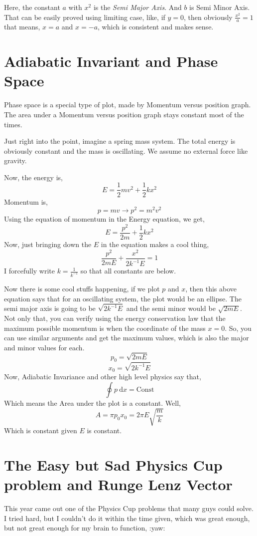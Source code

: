 \documentclass[11pt,a4paper]{article}
\begin{document}
Here, the constant $a$ with $x^2$ is the \emph{Semi Major Axis}. And $b$ is Semi Minor Axis. That can be easily proved using limiting case, like, if $y=0   $, 
then obviously $\frac{x^2}{a} = 1$ that means, $x = a$ and $x = -a$, which is consistent and makes sense. 
\section{ Adiabatic Invariant and Phase Space }

Phase space is a special type of plot, made by Momentum versus position graph. The area under a Momentum versus position graph stays constant most of the times. 

Just right into the point, imagine a spring mass system. The total energy is obviously constant and the mass is oscillating. We assume no external force like gravity.

Now, the energy is,
\[ 
E = \frac{1}{2} m v^2 + \frac{1}{2} k x^2
\]  
Momentum is, 
\[ 
p=mv \to p^2 = m^2 v^2
\]
Using the equation of momentum in the Energy equation, we get,
\[ 
E = \frac{p^2}{2m} + \frac{1}{2} kx^2
\]
Now, just bringing down the $E$ in the equation makes a cool thing,
\[ 
\frac{p^2}{2mE } + \frac{x^2}{2 k^{-1} E} = 1
\]
I forcefully write $k = \frac{1}{k^{-1}}$ so that all constants are below. 

Now there is some cool stuffs happening, if we plot $p$ and $x$, then this above equation says that for an oscillating system, the plot would be an ellipse. The semi major axis is going to be $\sqrt{2 k^{-1} E} $ and the semi minor would be $\sqrt{2 m E} $. Not only that, you can verify using the energy conservation law that the maximum possible momentum is when the coordinate of the mass $x=0$. So, you can use similar arguments and get the maximum values, which is also the major and minor values for each.
\[ 
p_0 = \sqrt{2mE} 
\]
\[
    x_0 = \sqrt{2 k^{-1} E} 
\]
Now, Adiabatic Invariance and other high level physics say that,
\[ 
\oint p \ \mathrm{d}  x = \text{Const}
\]
Which means the Area under the plot is a constant. Well,
\[ 
A = \pi p_0 x_0 = 2 \pi E \sqrt{\frac{m}{k}} 
\] 
Which is constant given $E$ is constant. 

\section{ The Easy but Sad Physics Cup problem and Runge Lenz Vector }

This year came out one of the Physics Cup problems that many guys could solve. I tried hard,
but I couldn't do it within the time given, which was great enough, but not great enough for my brain to function, :yaw:
\end{document}
